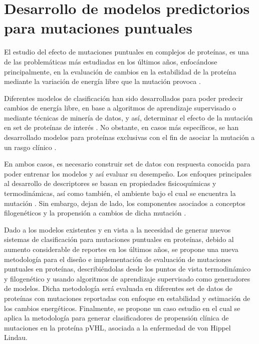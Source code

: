 
\chapter{Desarrollo de modelos predictorios para mutaciones puntuales}

\ifpdf
    \graphicspath{{Chapter2/Figs/Raster/}{Chapter2/Figs/PDF/}{Chapter2/Figs/}}
\else
    \graphicspath{{Chapter2/Figs/Vector/}{Chapter2/Figs/}}
\fi

El estudio del efecto de mutaciones puntuales en complejos de proteínas, es una de las problemáticas más estudiadas en los últimos años, enfocándose principalmente, en la evaluación de cambios en la estabilidad de la proteína mediante la variación de energía libre que la mutación provoca \cite{Schymkowitz2005,Pandurangan2017,rohl2004protein,Parthiban2006}. 

Diferentes modelos de clasificación han sido desarrollados para poder predecir cambios de energía libre, en base a algoritmos de aprendizaje supervisado o mediante técnicas de minería de datos, y así, determinar el efecto de la mutación en set de proteínas de interés \cite{Quan2016,Capriotti2008,Broom2017,Khan2010,vaisman,Getov2016,Capriotti2005}. No obstante, en casos más específicos, se han desarrollado modelos para proteínas exclusivas con el fin de asociar la mutación a un rasgo clínico \cite{article}. 

En ambos casos, es necesario construir set de datos con respuesta conocida para poder entrenar los modelos y así evaluar su desempeño. Los enfoques principales al desarrollo de descriptores se basan en propiedades fisicoquímicas y termodinámicas, así como también, el ambiente bajo el cual se encuentra la mutación \cite{Capriotti2005}. Sin embargo, dejan de lado, los componentes asociados a conceptos filogenéticos y la propensión a cambios de dicha mutación \cite{Olivera-Nappa2011}.

Dado a los modelos existentes y en vista a la necesidad de generar nuevos sistemas de clasificación para mutaciones puntuales en proteínas, debido al aumento considerable de reportes en los últimos años, se propone una nueva metodología para el diseño e implementación de evaluación de mutaciones puntuales en proteínas, describiéndolas desde los puntos de vista termodinámico y filogenético y usando algoritmos de aprendizaje supervisado como generadores de modelos. Dicha metodología será evaluada en diferentes set de datos de proteínas con mutaciones reportadas con enfoque en estabilidad y estimación de los cambios energéticos. Finalmente, se propone un caso estudio en el cual se aplica la metodología para generar clasificadores de propensión clínica de mutaciones en la proteína pVHL, asociada a la enfermedad de von Hippel Lindau.

